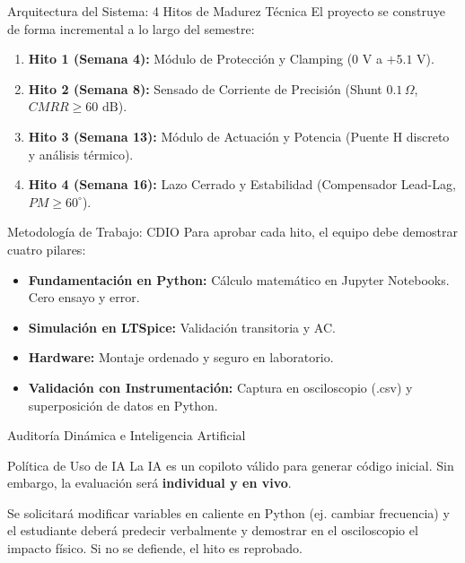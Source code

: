 \documentclass[aspectratio=169]{beamer}
\begin{document}
\begin{frame}{Arquitectura del Sistema: 4 Hitos de Madurez Técnica}
    El proyecto se construye de forma incremental a lo largo del semestre:
    \vspace{0.3cm}
    \begin{enumerate}
        \item \textbf{Hito 1 (Semana 4):} Módulo de Protección y Clamping ($0\text{ V}$ a $+5.1\text{ V}$).
        \item \textbf{Hito 2 (Semana 8):} Sensado de Corriente de Precisión (Shunt $0.1\,\Omega$, $CMRR \ge 60\text{ dB}$).
        \item \textbf{Hito 3 (Semana 13):} Módulo de Actuación y Potencia (Puente H discreto y análisis térmico).
        \item \textbf{Hito 4 (Semana 16):} Lazo Cerrado y Estabilidad (Compensador Lead-Lag, $PM \ge 60^\circ$).
    \end{enumerate}
\end{frame}

\begin{frame}{Metodología de Trabajo: CDIO}
    Para aprobar cada hito, el equipo debe demostrar cuatro pilares:
    \begin{itemize}
        \item \textbf{Fundamentación en Python:} Cálculo matemático en Jupyter Notebooks. Cero ensayo y error.
        \item \textbf{Simulación en LTSpice:} Validación transitoria y AC.
        \item \textbf{Hardware:} Montaje ordenado y seguro en laboratorio.
        \item \textbf{Validación con Instrumentación:} Captura en osciloscopio (.csv) y superposición de datos en Python.
    \end{itemize}
\end{frame}

\begin{frame}{Auditoría Dinámica e Inteligencia Artificial}
    \begin{alertblock}{Política de Uso de IA}
        La IA es un copiloto válido para generar código inicial. Sin embargo, la evaluación será \textbf{individual y en vivo}.
    \end{alertblock}
    \vspace{0.3cm}
    Se solicitará modificar variables en caliente en Python (ej. cambiar frecuencia) y el estudiante deberá predecir verbalmente y demostrar en el osciloscopio el impacto físico. Si no se defiende, el hito es reprobado.
\end{frame}
\end{document}
